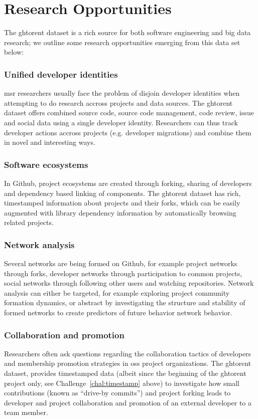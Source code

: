 \documentclass[conference]{IEEEtran}
\begin{document}
\section{Research Opportunities}

The {\sc ght}orent dataset is a rich source for both software engineering and
big data research; we outline some research opportunities emerging from
this data set below:

\subsubsection{Unified developer identities} {\sc msr} researchers usually face the
problem of disjoin developer identities when attempting to do research accross
projects and data sources. The {\sc ght}orent dataset offers
combined source code, source code management, code review, issue and social
data using a single developer identity. Researchers can thus track developer
actions accross projects (e.g. developer migrations) and combine them in 
novel and interesting ways. 

\subsubsection{Software ecosystems} In Github, project ecosystems are created
through forking, sharing of developers and dependency based linking of
components. The {\sc ght}orent dataset has rich, timestamped information about 
projects and their forks, which can be easily augmented with library
dependency information by automatically browsing related projects.

\subsubsection{Network analysis} Several networks are being formed on
Github, for example project networks through forks, developer networks
through participation to common projects, social networks through following
other users and watching repositories. Network analysis can either
be targeted, for example exploring project community formation dynamics, or
abstract by investigating the structure and stability of formed networks to
create predictors of future behavior network behavior.

\subsubsection{Collaboration and promotion} Researchers often ask questions
regarding the collaboration tactics of developers and membership promotion
strategies in {\sc oss} project organizations.  The {\sc ght}orent dataset,
provides timestamped data (albeit since the beginning of the {\sc ght}orent
project only, see Challenge~\ref{chal:timestamp} above) to investigate
how small contributions (known as ``drive-by commits'') and project
forking leads to developer and project collaboration and promotion of an
external developer to a team member.
\end{document}
